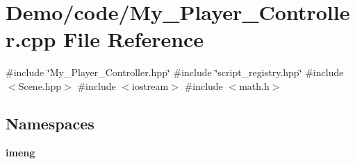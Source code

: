 \section{Demo/code/\+My\+\_\+\+Player\+\_\+\+Controller.cpp File Reference}
\label{_my___player___controller_8cpp}
{\ttfamily \#include \char`\"{}My\+\_\+\+Player\+\_\+\+Controller.\+hpp\char`\"{}}\newline
{\ttfamily \#include \char`\"{}script\+\_\+registry.\+hpp\char`\"{}}\newline
{\ttfamily \#include $<$Scene.\+hpp$>$}\newline
{\ttfamily \#include $<$iostream$>$}\newline
{\ttfamily \#include $<$math.\+h$>$}\newline
\subsection*{Namespaces}
\begin{DoxyCompactItemize}
\item 
 \textbf{ imeng}
\end{DoxyCompactItemize}
